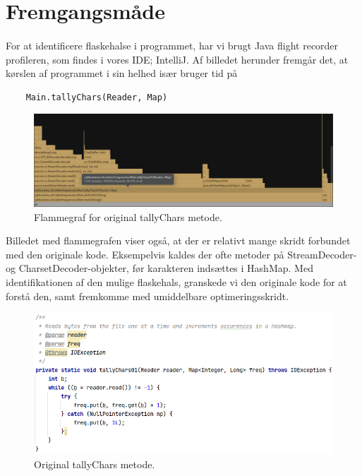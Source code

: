 \documentclass{article}
\begin{document}
\section{Fremgangsmåde}
\paragraph{}
For at identificere flaskehalse i programmet, har vi brugt Java flight recorder profileren, som findes i vores IDE; IntelliJ. 
Af billedet herunder fremgår det, at kørslen af programmet i sin helhed især bruger tid på \begin{verbatim}
    Main.tallyChars(Reader, Map)
\end{verbatim}
\begin{figure}[htb]
    \centering
    \includegraphics[width=\textwidth]{images/tallyChars01.PNG}
    \caption{Flammegraf for original tallyChars metode.}
    \label{fig:1}
\end{figure}
Billedet med flammegrafen viser også, at der er relativt mange skridt forbundet med den originale kode. Eksempelvis kaldes der ofte metoder på StreamDecoder- og CharsetDecoder-objekter, før karakteren indsættes i HashMap.
Med identifikationen af den mulige flaskehals, granskede vi den originale kode for at forstå den, samt fremkomme med umiddelbare optimeringsskridt.
\begin{figure}[htb]
    \centering
    \includegraphics[width=\textwidth]{images/tallyChars01_code.PNG}
    \caption{Original tallyChars metode.}
    \label{fig:2}
\end{figure}
\end{document}
